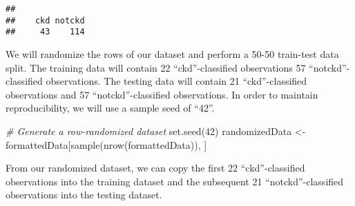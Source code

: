 \documentclass[
]{article}
\newenvironment{Shaded}{\begin{snugshade}}{\end{snugshade}}
\newcommand{\CommentTok}[1]{\textcolor[rgb]{0.56,0.35,0.01}{\textit{#1}}}
\newcommand{\DecValTok}[1]{\textcolor[rgb]{0.00,0.00,0.81}{#1}}
\newcommand{\FunctionTok}[1]{\textcolor[rgb]{0.00,0.00,0.00}{#1}}
\newcommand{\NormalTok}[1]{#1}
\newcommand{\OtherTok}[1]{\textcolor[rgb]{0.56,0.35,0.01}{#1}}
\begin{document}
\begin{verbatim}
## 
##    ckd notckd 
##     43    114
\end{verbatim}

We will randomize the rows of our dataset and perform a 50-50 train-test
data split. The training data will contain 22 ``ckd''-classified
observations 57 ``notckd''-classified observations. The testing data
will contain 21 ``ckd''-classified observations and 57
``notckd''-classified observations. In order to maintain
reproducibility, we will use a sample seed of ``42''.

\begin{Shaded}
\begin{Highlighting}[]
\CommentTok{\# Generate a row{-}randomized dataset}
\FunctionTok{set.seed}\NormalTok{(}\DecValTok{42}\NormalTok{)}
\NormalTok{randomizedData }\OtherTok{\textless{}{-}}\NormalTok{ formattedData[}\FunctionTok{sample}\NormalTok{(}\FunctionTok{nrow}\NormalTok{(formattedData)), ]}
\end{Highlighting}
\end{Shaded}

From our randomized dataset, we can copy the first 22 ``ckd''-classified
observations into the training dataset and the subsequent 21
``notckd''-classified observations into the testing dataset.
\end{document}
